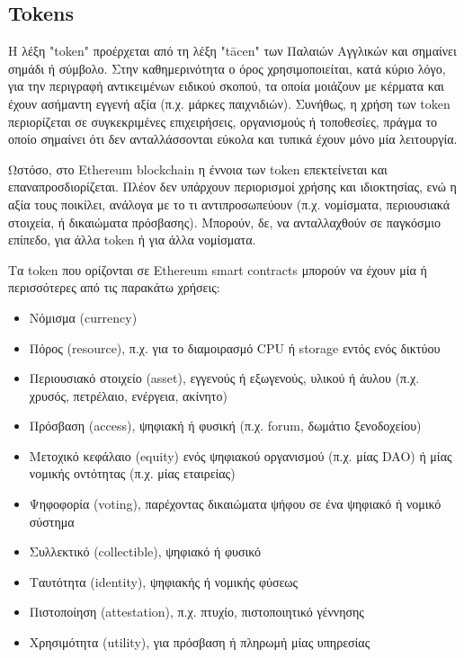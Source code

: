 \subsection{Tokens}

Η λέξη "token" προέρχεται από τη λέξη "tācen" των Παλαιών Αγγλικών και σημαίνει σημάδι ή
σύμβολο. Στην καθημερινότητα ο όρος χρησιμοποιείται, κατά κύριο λόγο, για την περιγραφή αντικειμένων ειδικού σκοπού, τα οποία μοιάζουν με κέρματα και έχουν ασήμαντη εγγενή αξία (π.χ. μάρκες παιχνιδιών). Συνήθως, η χρήση των token περιορίζεται σε συγκεκριμένες επιχειρήσεις, οργανισμούς ή τοποθεσίες, πράγμα το οποίο σημαίνει ότι δεν ανταλλάσσονται εύκολα και τυπικά έχουν μόνο μία λειτουργία.\cite{2.6-ethereum-mastering}

Ωστόσο, στο Ethereum blockchain η έννοια των token επεκτείνεται και επαναπροσδιορίζεται. Πλέον δεν υπάρχουν περιορισμοί χρήσης και ιδιοκτησίας, ενώ η αξία τους ποικίλει, ανάλογα με το τι αντιπροσωπεύουν (π.χ. νομίσματα, περιουσιακά στοιχεία, ή δικαιώματα πρόσβασης). Μπορούν, δε, να ανταλλαχθούν σε παγκόσμιο επίπεδο, για άλλα token ή για άλλα νομίσματα.

Τα token που ορίζονται σε Ethereum smart contracts μπορούν να έχουν μία ή περισσότερες από τις παρακάτω χρήσεις:

\begin{itemize}
	\item Νόμισμα (currency)
	\item Πόρος (resource), π.χ. για το διαμοιρασμό CPU ή storage εντός ενός δικτύου
	\item Περιουσιακό στοιχείο (asset), εγγενούς ή εξωγενούς, υλικού
ή άυλου (π.χ. χρυσός, πετρέλαιο, ενέργεια, ακίνητο)
	\item Πρόσβαση (access), ψηφιακή ή
φυσική (π.χ. forum, δωμάτιο ξενοδοχείου)
	\item Μετοχικό κεφάλαιο (equity) ενός ψηφιακού οργανισμού (π.χ. μίας DAO) ή μίας νομικής οντότητας (π.χ. μίας εταιρείας)
	\item Ψηφοφορία (voting), παρέχοντας δικαιώματα ψήφου σε ένα ψηφιακό ή νομικό σύστημα
	\item Συλλεκτικό (collectible), ψηφιακό ή φυσικό
	\item Ταυτότητα (identity), ψηφιακής ή νομικής φύσεως
	\item Πιστοποίηση (attestation), π.χ. πτυχίο, πιστοποιητικό γέννησης
	\item Χρησιμότητα (utility), για πρόσβαση ή πληρωμή μίας υπηρεσίας
\end{itemize}

